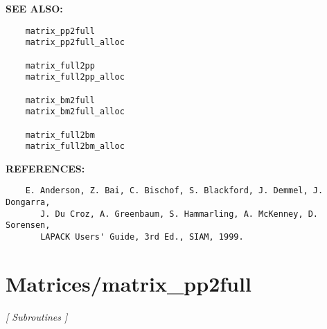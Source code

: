 \textbf{SEE ALSO:}\hspace{0.08in}\begin{Verbatim}
    matrix_pp2full
    matrix_pp2full_alloc

    matrix_full2pp
    matrix_full2pp_alloc

    matrix_bm2full
    matrix_bm2full_alloc

    matrix_full2bm
    matrix_full2bm_alloc
\end{Verbatim}
\textbf{REFERENCES:}\hspace{0.08in}\begin{Verbatim}
    E. Anderson, Z. Bai, C. Bischof, S. Blackford, J. Demmel, J. Dongarra,
       J. Du Croz, A. Greenbaum, S. Hammarling, A. McKenney, D. Sorensen,
       LAPACK Users' Guide, 3rd Ed., SIAM, 1999.
\end{Verbatim}
\section{Matrices/matrix\_pp2full}
\textsl{[ Subroutines ]}

